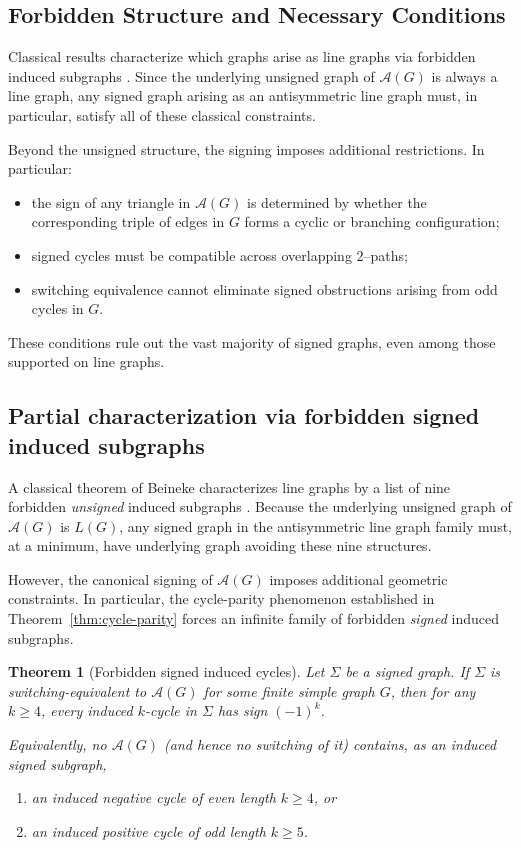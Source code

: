 \documentclass[11pt]{article}
\newtheorem{theorem}{Theorem}
\theoremstyle{plain}
\begin{document}
\subsection{Forbidden Structure and Necessary Conditions}

Classical results characterize which graphs arise as line graphs via forbidden
induced subgraphs \cite{Beineke1970,West2001}.
Since the underlying unsigned graph of $\mathcal{A}(G)$ is always a line graph,
any signed graph arising as an antisymmetric line graph must, in particular,
satisfy all of these classical constraints.

Beyond the unsigned structure, the signing imposes additional restrictions.
In particular:
\begin{itemize}
  \item the sign of any triangle in $\mathcal{A}(G)$ is determined by whether the
  corresponding triple of edges in $G$ forms a cyclic or branching configuration;
  \item signed cycles must be compatible across overlapping $2$--paths;
  \item switching equivalence cannot eliminate signed obstructions arising from
  odd cycles in $G$.
\end{itemize}

These conditions rule out the vast majority of signed graphs, even among those
supported on line graphs.

\subsection{Partial characterization via forbidden signed induced subgraphs}
\label{subsec:forbidden-subgraphs}

A classical theorem of Beineke characterizes line graphs by a list of nine forbidden
\emph{unsigned} induced subgraphs \cite{Beineke1970}. Because the underlying unsigned graph
of $\mathcal A(G)$ is $L(G)$, any signed graph in the antisymmetric line graph family must,
at a minimum, have underlying graph avoiding these nine structures.

However, the canonical signing of $\mathcal A(G)$ imposes additional geometric constraints.
In particular, the cycle-parity phenomenon established in Theorem~\ref{thm:cycle-parity}
forces an infinite family of forbidden \emph{signed} induced subgraphs.

\begin{theorem}[Forbidden signed induced cycles]\label{thm:forbidden-cycles}
Let $\Sigma$ be a signed graph. If $\Sigma$ is switching-equivalent to $\mathcal A(G)$ for
some finite simple graph $G$, then for any $k\ge 4$, every induced $k$-cycle in $\Sigma$
has sign $(-1)^k$.

Equivalently, no $\mathcal A(G)$ (and hence no switching of it) contains, as an induced
signed subgraph,
\begin{enumerate}
\item an induced \emph{negative} cycle of even length $k\ge 4$, or
\item an induced \emph{positive} cycle of odd length $k\ge 5$.
\end{enumerate}
\end{theorem}
\end{document}
